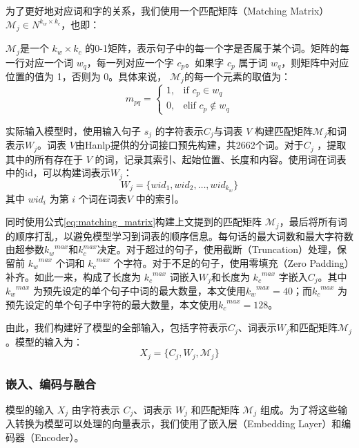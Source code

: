 \documentclass[12pt, a4paper]{ctexart}
\begin{document}
为了更好地对应词和字的关系，我们使用一个匹配矩阵（Matching Matrix）${\mathcal{M}}_j  \in N^{k_w \times k_c}$，也即：

${\mathcal{M}}_j$是一个 $k_w \times k_c$ 的0-1矩阵，表示句子中的每一个字是否属于某个词。矩阵的每一行对应一个词 $w_q$，每一列对应一个字 $c_p$。如果字 $c_p$ 属于词 $w_q$，则矩阵中对应位置的值为 1，否则为 0。具体来说，
$ {\mathcal{M}}_j$的每一个元素的取值为：
\begin{equation}
    m_{pq} = \begin{cases}
        1, & \text{if } c_p \in w_q \\
        0, & \text{elif } c_p \notin w_q
    \end{cases}
    \label{eq:matching_matrix}
\end{equation}

实际输入模型时，使用输入句子 $s_j$ 的字符表示$C_j$与词表 $V$ 构建匹配矩阵${\mathcal{M}}_j$和词表示$W_j$。词表 $V$由Hanlp提供的分词接口预先构建，共2662个词。对于$C_j$ ，提取其中的所有存在于 $V$ 的词，记录其索引、起始位置、长度和内容。使用词在词表中的id，可以构建词表示$W_j$：
\begin{equation}
    W_j = \{wid_1, wid_2, \dots, wid_{k_w}\}
\end{equation}
其中 $wid_i$ 为第 $i$ 个词在词表$V$ 中的索引。

同时使用公式\ref{eq:matching_matrix}构建上文提到的匹配矩阵 ${\mathcal{M}}_j$，最后将所有词的顺序打乱，以避免模型学习到词表的顺序信息。每句话的最大词数和最大字符数由超参数${k_w}^{max}$和${k_c^{max}}$决定。对于超过的句子，使用截断（Truncation）处理，保留前 ${k_w}^{max}$ 个词和 ${k_c}^{max}$ 个字符。对于不足的句子，使用零填充（Zero Padding）补齐。如此一来，构成了长度为 ${k_c}^{max}$ 词嵌入$W_j$和长度为 ${k_c}^{max}$ 字嵌入$C_j$。其中 ${k_w}^{max}$ 为预先设定的单个句子中词的最大数量，本文使用${k_w}^{max}=40$；而${k_c}^{max}$ 为预先设定的单个句子中字符的最大数量，本文使用${k_c}^{max}=128$。

由此，我们构建好了模型的全部输入，包括字符表示$C_j$、词表示$W_j$和匹配矩阵${\mathcal{M}}_j$。模型的输入为：
\begin{equation}
        X_j = \{C_j, W_j, {\mathcal{M}}_j\}
\end{equation}

\subsubsection{嵌入、编码与融合}
模型的输入 $X_j$ 由字符表示 $C_j$、词表示 $W_j$ 和匹配矩阵 ${\mathcal{M}}_j$ 组成。为了将这些输入转换为模型可以处理的向量表示，我们使用了嵌入层（Embedding Layer）和编码器（Encoder）。
\end{document}
